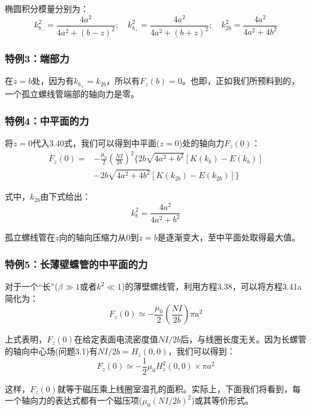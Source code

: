 椭圆积分模量分别为：
$$k_{b_-}^2=\frac{4a^2}{4a^2+(b-z)^2} ; \quad k_{b_+}^2=\frac{4a^2}{4a^2+(b+z)^2} ;\quad k_{2b}^2=\frac{4a^2}{4a^2+4 b^2}$$

\subsubsection{特例3：端部力}
在$z=b$处，因为有$k_{b_+}=k_{2b}$，所以有$F_z(b)=0$。也即，正如我们所预料到的，一个孤立螺线管端部的轴向力是零。

\subsubsection{特例4：中平面的力}
将$z=0$代入3.40式，我们可以得到中平面($z=0$)处的轴向力$F_z(0)$：
\begin{equation}
\begin{split}
  F_z(0)=&-\frac{\mu_0}{2}(\frac{NI}{2b})^2\{2b\sqrt{4a^2+b^2}[K(k_{b})-E(k_{b})]\\
  &-2b\sqrt{4a^2+4b^2}[K(k_{2b})-E(k_{2b})]\}
\end{split}
\end{equation}

式中，$k_{2b}$由下式给出：
$$k_{b}^2=\frac{4a^2}{4a^2+b^2}$$

孤立螺线管在$z$向的轴向压缩力从$0$到$z=b$是逐渐变大，至中平面处取得最大值。

\subsubsection{特例5：长薄壁螺管的中平面的力}
对于一个“长”($\beta\gg 1$或者$k^2\ll 1$)的薄壁螺线管，利用方程3.38，可以将方程3.41a简化为：
\begin{equation*}
F_z(0)\simeq-\frac{\mu_0}{2}(\frac{NI}{2b})\pi a^2 \tag{3.41'}
\end{equation*}

上式表明，$F_z(0)$在给定表面电流密度值$NI/2b$后，与线圈长度无关。因为长螺管的轴向中心场(问题3.1)有$NI/2b=H_z(0,0)$，我们可以得到：
\begin{equation*}
F_z(0)\simeq -\frac{1}{2}\mu_0 H_z^2(0,0)\times\pi a^2  \tag{3.41''}
\end{equation*}

这样，$F_z(0)$就等于磁压乘上线圈室温孔的面积。实际上，下面我们将看到，每一个轴向力的表达式都有一个磁压项($\mu_0(NI/2b)^2$)或其等价形式。

